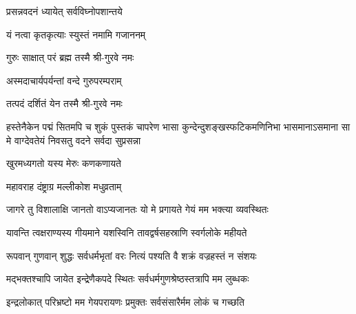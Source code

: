 

{प्रसन्नवदनं ध्यायेत् सर्वविघ्नोपशान्तये}

{यं नत्वा कृतकृत्याः स्युस्तं नमामि गजाननम्}


{गुरुः साक्षात् परं ब्रह्म तस्मै श्री-गुरवे नमः}

{अस्मदाचार्यपर्यन्तां वन्दे गुरुपरम्पराम्}

{तत्पदं दर्शितं येन तस्मै श्री-गुरवे नमः}

{हस्तेनैकेन पद्मं सितमपि च शुकं पुस्तकं चापरेण}
{भासा कुन्देन्दुशङ्खस्फटिकमणिनिभा भासमानाऽसमाना}
{सा मे वाग्देवतेयं निवसतु वदने सर्वदा सुप्रसन्ना}



{खुरमध्यगतो यस्य मेरुः कणकणायते}


{महावराह दंष्ट्राग्र मल्लीकोश मधुव्रताम्}





\twolineshloka
{जागरे तु विशालाक्षि जानतो वाऽप्यजानतः}
{यो मे प्रगायते गेयं मम भक्त्या व्यवस्थितः}%

\twolineshloka
{यावन्ति त्वक्षराण्यस्य गीयमाने यशस्विनि}
{तावद्वर्षसहस्राणि स्वर्गलोके महीयते}%

\twolineshloka
{रूपवान् गुणवान् शुद्धः सर्वधर्मभृतां वरः}
{नित्यं पश्यति वै शक्रं वज्रहस्तं न संशयः}%

\twolineshloka
{मद्भक्तश्चापि जायेत इन्द्रेणैकपदे स्थितः}
{सर्वधर्मगुणश्रेष्ठस्तत्रापि मम लुब्धकः}%

\twolineshloka
{इन्द्रलोकात् परिभ्रष्टो मम गेयपरायणः}
{प्रमुक्तः सर्वसंसारैर्मम लोकं च गच्छति}%

